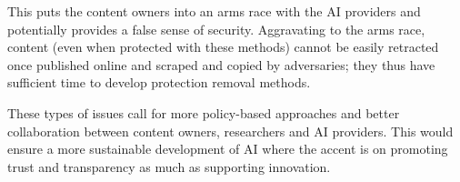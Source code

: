This puts the content owners into an arms race with the AI providers and potentially provides a false sense of security.
Aggravating to the arms race, content (even when protected with these methods) cannot be easily retracted once published online and scraped and copied by adversaries; they thus have sufficient time to develop protection removal methods.

These types of issues call for more policy-based approaches and better collaboration between content owners, researchers and AI providers. 
This would ensure a more sustainable development of AI where the accent is on promoting trust and transparency as much as supporting innovation. 